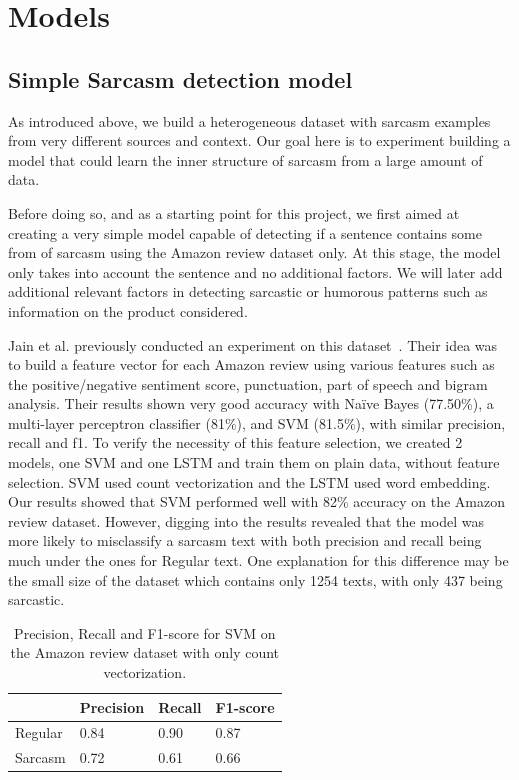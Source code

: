 \documentclass[10pt,twocolumn,letterpaper]{article}
\begin{document}
\section{Models}
\subsection{Simple Sarcasm detection model}
As introduced above, we build a heterogeneous dataset with sarcasm examples from very different sources and context.
Our goal here is to experiment building a model that could learn the inner structure of sarcasm from a large amount of data.

Before doing so, and as a starting point for this project, we first aimed at creating a very simple model capable of detecting if a sentence contains some from of sarcasm using the Amazon review dataset only.
At this stage, the model only takes into account the sentence and no additional factors. We will later add additional relevant factors in detecting sarcastic or humorous patterns such as information on the product considered.

Jain et al. previously conducted an experiment on this dataset~\cite{jain2019}.
Their idea was to build a feature vector for each Amazon review using various features such as the positive/negative sentiment score, punctuation, part of speech and bigram analysis.
Their results shown very good accuracy with Naïve Bayes (77.50\%), a multi-layer perceptron classifier (81\%), and SVM (81.5\%), with similar precision, recall and f1.
To verify the necessity of this feature selection, we created 2 models, one SVM and one LSTM and train them on plain data, without feature selection.
SVM used count vectorization and the LSTM used word embedding.
Our results showed that SVM performed well with 82\% accuracy on the Amazon review dataset.
However, digging into the results revealed that the model was more likely to misclassify a sarcasm text with both precision and recall being much under the ones for Regular text.
One explanation for this difference may be the small size of the dataset which contains only 1254 texts, with only 437 being sarcastic.

\begin{table}[H]
    \centering
    \begin{tabularx}{\linewidth}{|X|X|X|X|}
        \hline
        & Precision & Recall & F1-score \\
        \hline
        Regular & 0.84 & 0.90 & 0.87 \\
        \hline
        Sarcasm & 0.72 & 0.61 & 0.66 \\
        \hline
    \end{tabularx}
    \caption{Precision, Recall and F1-score for SVM on the Amazon review dataset with only count vectorization.}
\end{table}
\end{document}
